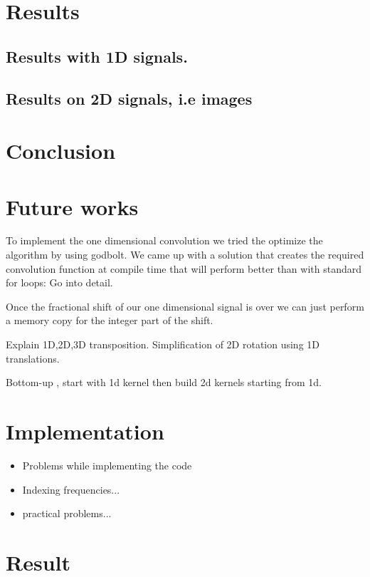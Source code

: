 \documentclass[]{usiinfbachelorproject}
\begin{document}
		
		
		\section{Results}
		\subsection{Results with 1D signals.}
		\subsection{Results on 2D signals, i.e images}
		
		
		\section{Conclusion}
		
		\section{Future works}
		
		
	
	
	To implement the one dimensional convolution we tried the optimize the algorithm by using godbolt. We came up with a solution that creates the required convolution function at compile time that will perform better than with standard for loops: Go into detail.
	
	Once the fractional shift of our one dimensional signal is over we can just perform a memory copy for the integer part of the shift.
	
	
	
	
	
	\iffalse	
	Explain 1D,2D,3D transposition.
	Simplification of 2D rotation using 1D translations.
	
	Bottom-up , start with 1d kernel then build 2d kernels starting from 1d.
	

	\section{Implementation}
	\begin{itemize}
		\item Problems while implementing the code
		\item Indexing frequencies...
		\item practical problems...
	\end{itemize}
	
	\section{Result}
	
\end{document}
